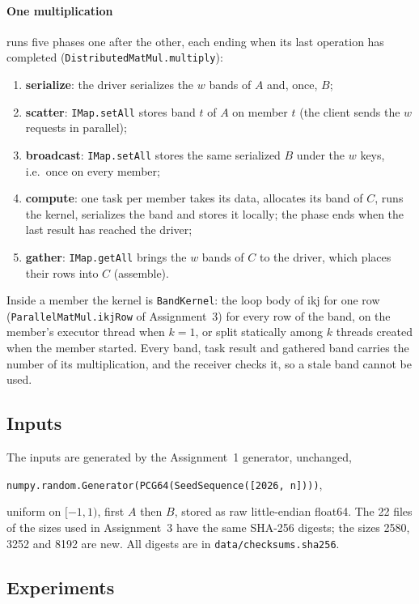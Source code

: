 \documentclass[11pt,a4paper]{article}
\begin{document}
\paragraph{One multiplication} runs five phases one after the other, each
ending when its last operation has completed (\texttt{DistributedMatMul.multiply}):
\begin{enumerate}
  \item \textbf{serialize}: the driver serializes the $w$ bands of $A$ and,
  once, $B$;
  \item \textbf{scatter}: \texttt{IMap.setAll} stores band $t$ of $A$ on member $t$
  (the client sends the $w$ requests in parallel);
  \item \textbf{broadcast}: \texttt{IMap.setAll} stores the same serialized $B$
  under the $w$ keys, i.e.\ once on every member;
  \item \textbf{compute}: one task per member takes its data, allocates its band
  of $C$, runs the kernel, serializes the band and stores it locally; the phase
  ends when the last result has reached the driver;
  \item \textbf{gather}: \texttt{IMap.getAll} brings the $w$ bands of $C$ to the
  driver, which places their rows into $C$ (assemble).
\end{enumerate}
Inside a member the kernel is \texttt{BandKernel}: the loop body of ikj for one
row (\texttt{ParallelMatMul.\allowbreak ikjRow} of Assignment~3) for every row of the band,
on the member's executor thread when $k=1$, or split statically among $k$
threads created when the member started. Every band, task result and gathered
band carries the number of its multiplication, and the receiver checks it, so a
stale band cannot be used.

\subsection{Inputs}

The inputs are generated by the Assignment~1 generator, unchanged,
\begin{center}\texttt{numpy.random.Generator(PCG64(SeedSequence([2026, n])))},\end{center}
uniform on $[-1,1)$, first $A$ then $B$, stored as raw little-endian float64. The 22
files of the sizes used in Assignment~3 have the same SHA-256 digests; the
sizes 2580, 3252 and 8192 are new. All digests are in
\texttt{data/checksums.sha256}.

\subsection{Experiments}
\label{sec:experiments}
\end{document}

